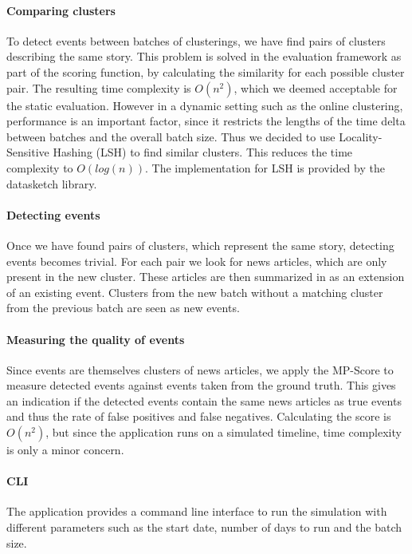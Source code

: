 \paragraph{Comparing clusters}
To detect events between batches of clusterings,
we have find pairs of clusters describing the same story.
This problem is solved in the evaluation framework as part of the scoring function,
by calculating the similarity for each possible cluster pair.
The resulting time complexity is $O(n^2)$, which we deemed acceptable for the static evaluation.
However in a dynamic setting such as the online clustering, performance is an important factor,
since it restricts the lengths of the time delta between batches and the overall batch size.
Thus we decided to use Locality-Sensitive Hashing (LSH)\cite{alex2015practical} to find similar clusters.
This reduces the time complexity to $O(log(n))$.
The implementation for LSH is provided by the datasketch library\cite{eric_zhu_2017_290602}.


\paragraph{Detecting events}
Once we have found pairs of clusters, which represent the same story, detecting events becomes trivial.
For each pair we look for news articles, which are only present in the new cluster.
These articles are then summarized in as an extension of an existing event.
Clusters from the new batch without a matching cluster from the previous batch
are seen as new events.

\paragraph{Measuring the quality of events} 
Since events are themselves clusters of news articles,
we apply the MP-Score to measure detected events against events taken from the ground truth.
This gives an indication if the detected events contain the same news articles
as true events and thus the rate of false positives and false negatives.
Calculating the score is $O(n^2)$, but since the application runs on a simulated timeline,
time complexity is only a minor concern.

\paragraph{CLI}
The application provides a command line interface to run the simulation with different parameters
such as the start date, number of days to run and the batch size.

